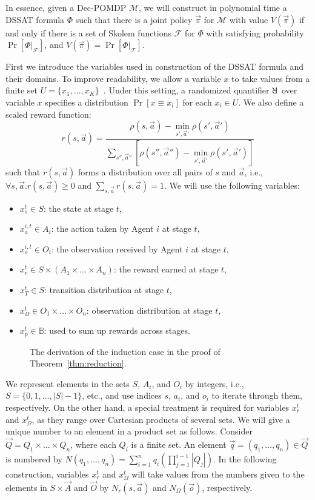 In essence, given a Dec-POMDP $\mathcal{M}$, we will construct in polynomial time a DSSAT formula $\Phi$ such that there is a joint policy $\vec{\pi}$ for $\mathcal{M}$ with value $V(\vec{\pi})$ if and only if there is a set of Skolem functions $\mathcal{F}$ for $\Phi$ with satisfying probability $\Pr[\Phi|_{\mathcal{F}}]$, and $V(\vec{\pi})=\Pr[\Phi|_{\mathcal{F}}]$.

First we introduce the variables used in construction of the DSSAT formula and their domains.
To improve readability, we allow a variable $x$ to take values from a finite set $U=\{x_1,\ldots,x_K\}$~\cite{Salmon2020}.
Under this setting, a randomized quantifier $\random{}$ over variable $x$ specifies a distribution $\Pr[x\equiv x_i]$ for each $x_i\in U$.
We also define a scaled reward function:
\[
    r(s,\vec{a})=\frac{\rho(s,\vec{a})-\min_{s',\vec{a}'}\rho(s',\vec{a}')}{\sum_{s'',\vec{a}''}[\rho(s'',\vec{a}'')-\min_{s',\vec{a}'}\rho(s',\vec{a}')]}
\]
such that $r(s,\vec{a})$ forms a distribution over all pairs of $s$ and $\vec{a}$, i.e., $\forall s,\vec{a}.r(s,\vec{a})\geq 0$ and $\sum_{s,\vec{a}}r(s,\vec{a})=1$.
We will use the following variables:
\begin{itemize}
    \item $x_s^t\in S$: the state at stage $t$,
    \item $x_a^{i,t}\in A_i$: the action taken by Agent $i$ at stage $t$,
    \item $x_o^{i,t}\in O_i$: the observation received by Agent $i$ at stage $t$,
    \item $x_r^t\in S\times (A_1\times\ldots\times A_n)$: the reward earned at stage $t$,
    \item $x_T^t\in S$: transition distribution at stage $t$,
    \item $x_\Omega^t\in O_1\times\ldots\times O_n$: observation distribution at stage $t$,
    \item $x_p^t\in \mathbb{B}$: used to sum up rewards across stages.
\end{itemize}

\begin{figure*}[t]
    \centering
    
    \caption{The derivation of the induction case in the proof of Theorem~\ref{thm:reduction}.}
    \label{fig:derivation}
\end{figure*}

We represent elements in the sets $S$, $A_i$, and $O_i$ by integers, i.e., $S=\{0,1,\ldots,|S|-1\}$, etc., and use indices $s$, $a_i$, and $o_i$ to iterate through them, respectively.
On the other hand, a special treatment is required for variables $x_r^t$ and $x_\Omega^t$, as they range over Cartesian products of several sets.
We will give a unique number to an element in a product set as follows.
Consider $\vec{Q}=Q_1\times\ldots\times Q_n$, where each $Q_i$ is a finite set.
An element $\vec{q}=(q_1,\ldots,q_n)\in \vec{Q}$ is numbered by $N(q_1,\ldots,q_n)=\sum_{i=1}^n q_i(\prod_{j=1}^{i-1}|Q_j|)$.
In the following construction, variables $x_r^t$ and $x_\Omega^t$ will take values from the numbers given to the elements in $S\times\vec{A}$ and $\vec{O}$ by $N_r(s,\vec{a})$ and $N_\Omega(\vec{o})$, respectively.

